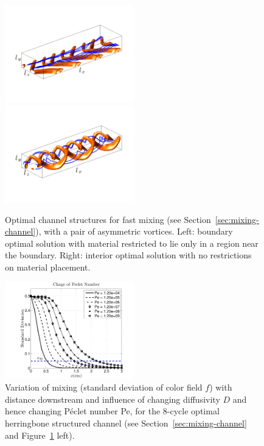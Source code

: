 \documentclass[times]{fldauth}
\begin{document}
  \begin{figure}
    \centerline{
      \includegraphics[width=0.5\textwidth,trim=35 75 35 65,clip=true]{example2structureherringbone}
      \includegraphics[width=0.5\textwidth,trim=35 75 35 65,clip=true]{example2structure3d}
      }
      \caption{\label{example2structureNew} Optimal channel structures
        for fast mixing (see Section~\ref{sec:mixing-channel}), with a
        pair of asymmetric vortices. Left: boundary optimal solution
        with material restricted to lie only in a region near the
        boundary. Right: interior optimal solution with no
        restrictions on material placement.}
  \end{figure}

  \begin{figure}
    \centerline{
      \includegraphics[width=0.5\textwidth,trim=50 0 30 20,clip=true]{example2veryPe2}}
    \caption{\label{example2trajectory} Variation of mixing (standard
      deviation of color field $f$) with distance downstream and
      influence of changing diffusivity $D$ and hence changing
      P\'{e}clet number Pe, for the $8$-cycle optimal herringbone
      structured channel (see Section~\ref{sec:mixing-channel} and
      Figure~\ref{example2structureNew} left).}
  \end{figure}
\end{document}
